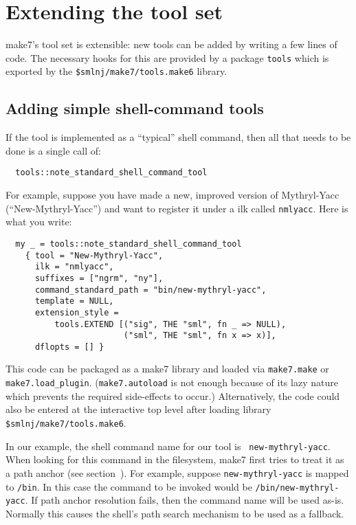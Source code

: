 
\section{Extending the tool set}
\label{sec:moretools}

make7's tool set is extensible: new tools can be added by writing a few
lines of code.  The necessary hooks for this are provided by a
package {\tt tools} which is exported by the {\tt \$smlnj/make7/tools.make6}
library.

\subsection{Adding simple shell-command tools}
\label{sec:addshellilk}

If the tool is implemented as a ``typical'' shell command, then all
that needs to be done is a single call of:

\begin{verbatim}
  tools::note_standard_shell_command_tool
\end{verbatim}

For example, suppose you have made a
new, improved version of Mythryl-Yacc (``New-Mythryl-Yacc'') and want to
register it under a ilk called {\tt nmlyacc}.  Here is what you
write:

\begin{verbatim}
  my _ = tools::note_standard_shell_command_tool
    { tool = "New-Mythryl-Yacc",
      ilk = "nmlyacc",
      suffixes = ["ngrm", "ny"],
      command_standard_path = "bin/new-mythryl-yacc",
      template = NULL,
      extension_style =
          tools.EXTEND [("sig", THE "sml", fn _ => NULL),
                        ("sml", THE "sml", fn x => x)],
      dflopts = [] }
\end{verbatim}

This code can be packaged as a make7 library and loaded via {\tt make7.make}
or {\tt make7.load\_plugin}.  ({\tt make7.autoload} is not enough because of
its lazy nature which prevents the required side-effects to occur.)
Alternatively, the code could also be entered at the interactive top
level after loading library {\tt \$smlnj/make7/tools.make6}.

In our example, the shell command name for our tool is {\tt
new-mythryl-yacc}.  When looking for this command in the filesystem, make7
first tries to treat it as a path anchor (see
section~).  For example, suppose {\tt new-mythryl-yacc} is
mapped to {\tt /bin}.  In this case the command to be
invoked would be {\tt /bin/new-mythryl-yacc}.  If path anchor resolution
fails, then the command name will be used as-is.  Normally this
causes the shell's path search mechanism to be used as a fallback.

